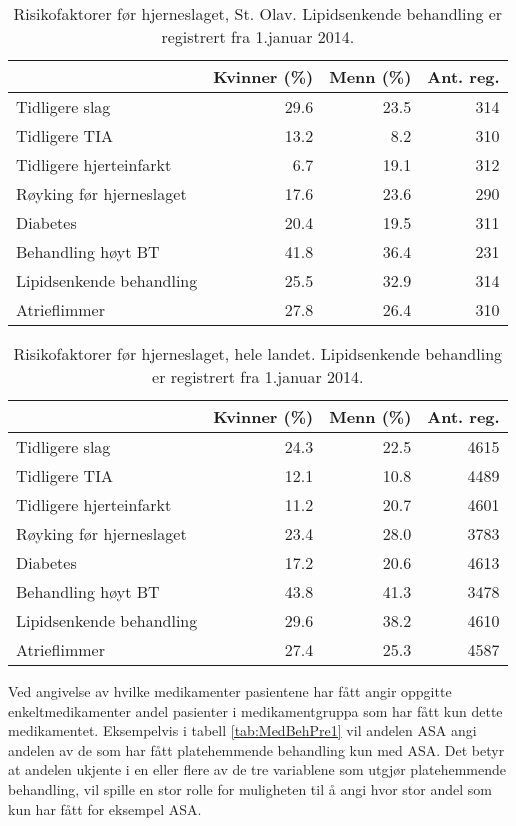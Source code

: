 \documentclass [norsk,a4paper,twoside]{article}\usepackage[]{graphicx}\usepackage[]{color}
\begin{document}
\begin{table}[ht]
\centering
\begin{tabular}{lrrr}
  \hline
 & Kvinner (\%) & Menn (\%) & Ant. reg. \\ 
  \hline
Tidligere slag & 29.6 & 23.5 & 314 \\ 
  Tidligere TIA & 13.2 & 8.2 & 310 \\ 
  Tidligere hjerteinfarkt & 6.7 & 19.1 & 312 \\ 
  Røyking før hjerneslaget & 17.6 & 23.6 & 290 \\ 
  Diabetes & 20.4 & 19.5 & 311 \\ 
  Behandling høyt BT & 41.8 & 36.4 & 231 \\ 
  Lipidsenkende behandling & 25.5 & 32.9 & 314 \\ 
  Atrieflimmer & 27.8 & 26.4 & 310 \\ 
   \hline
\end{tabular}
\caption{Risikofaktorer før hjerneslaget, St. Olav. Lipidsenkende behandling er registrert 
		fra 1.januar 2014.} 
\label{tab:Risiko1}
\end{table}
\begin{table}[ht]
\centering
\begin{tabular}{lrrr}
  \hline
 & Kvinner (\%) & Menn (\%) & Ant. reg. \\ 
  \hline
Tidligere slag & 24.3 & 22.5 & 4615 \\ 
  Tidligere TIA & 12.1 & 10.8 & 4489 \\ 
  Tidligere hjerteinfarkt & 11.2 & 20.7 & 4601 \\ 
  Røyking før hjerneslaget & 23.4 & 28.0 & 3783 \\ 
  Diabetes & 17.2 & 20.6 & 4613 \\ 
  Behandling høyt BT & 43.8 & 41.3 & 3478 \\ 
  Lipidsenkende behandling & 29.6 & 38.2 & 4610 \\ 
  Atrieflimmer & 27.4 & 25.3 & 4587 \\ 
   \hline
\end{tabular}
\caption{Risikofaktorer før hjerneslaget, hele landet. Lipidsenkende behandling er registrert 
		fra 1.januar 2014.} 
\label{tab:Risiko2}
\end{table}



Ved angivelse av hvilke medikamenter pasientene har fått  angir oppgitte enkeltmedikamenter 
andel pasienter i medikamentgruppa 
som har fått kun dette medikamentet. Eksempelvis i tabell \ref{tab:MedBehPre1} vil andelen ASA 
angi andelen av de som har fått platehemmende behandling kun med ASA. Det betyr at andelen 
ukjente i en eller flere av de tre variablene som utgjør platehemmende behandling, vil spille 
en stor rolle for muligheten til å angi hvor stor andel som kun har fått for eksempel ASA.
\end{document}

